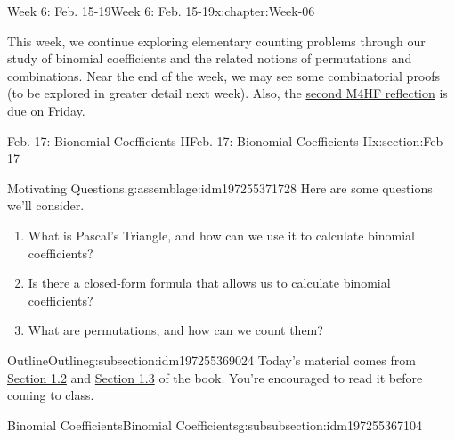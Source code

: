 \documentclass[oneside,10pt,]{book}
\numberwithin{equation}{section}
\begin{document}
\begin{chapterptx}{Week 6: Feb. 15-19}{}{Week 6: Feb. 15-19}{}{}{x:chapter:Week-06}
\begin{introduction}{}%
This week, we continue exploring elementary counting problems through our study of binomial coefficients and the related notions of permutations and combinations. Near the end of the week, we may see some combinatorial proofs (to be explored in greater detail next week). Also, the \href{}{second M4HF reflection} is due on Friday.%
\end{introduction}%
%
%
\typeout{************************************************}
\typeout{************************************************}
%
\begin{sectionptx}{Feb. 17: Bionomial Coefficients II}{}{Feb. 17: Bionomial Coefficients II}{}{}{x:section:Feb-17}
\begin{introduction}{}%
\begin{assemblage}{Motivating Questions.}{g:assemblage:idm197255371728}%
Here are some questions we'll consider. %
\begin{enumerate}
\item{}What is Pascal's Triangle, and how can we use it to calculate binomial coefficients?%
\item{}Is there a closed-form formula that allows us to calculate binomial coefficients?%
\item{}What are permutations, and how can we count them?%
\end{enumerate}
%
\end{assemblage}
\end{introduction}%
%
%
\typeout{************************************************}
\typeout{************************************************}
%
\begin{subsectionptx}{Outline}{}{Outline}{}{}{g:subsection:idm197255369024}
Today's material comes from \href{http://discrete.openmathbooks.org/dmoi3/sec_counting-binom.html}{Section 1.2} and \href{http://discrete.openmathbooks.org/dmoi3/sec_counting-combperm.html}{Section 1.3} of the book. You're encouraged to read it before coming to class.%
%
%
\typeout{************************************************}
\typeout{************************************************}
%
\begin{subsubsectionptx}{Binomial Coefficients}{}{Binomial Coefficients}{}{}{g:subsubsection:idm197255367104}

\end{subsubsectionptx}
\end{subsectionptx}
\end{sectionptx}
\end{chapterptx}
\end{document}
